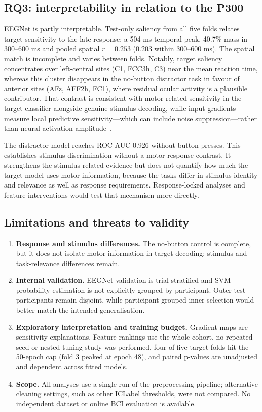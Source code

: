 \documentclass[11pt,a4paper]{article}
\begin{document}
\subsection{RQ3: interpretability in relation to the P300}
EEGNet is partly interpretable. Test-only saliency from all five folds relates target sensitivity to the late response: a 504 ms temporal peak, 40.7\% mass in 300--600 ms and pooled spatial $r=0.253$ ($0.203$ within 300--600 ms). The spatial match is incomplete and varies between folds. Notably, target saliency concentrates over left-central sites (C1, FCC3h, C3) near the mean reaction time, whereas this cluster disappears in the no-button distractor task in favour of anterior sites (AFz, AFF2h, FC1), where residual ocular activity is a plausible contributor. That contrast is consistent with motor-related sensitivity in the target classifier alongside genuine stimulus decoding, while input gradients measure local predictive sensitivity—which can include noise suppression—rather than neural activation amplitude~\cite{haufe}.

The distractor model reaches ROC-AUC 0.926 without button presses. This establishes stimulus discrimination without a motor-response contrast. It strengthens the stimulus-related evidence but does not quantify how much the target model uses motor information, because the tasks differ in stimulus identity and relevance as well as response requirements. Response-locked analyses and feature interventions would test that mechanism more directly.

\subsection{Limitations and threats to validity}
\begin{enumerate}
\item \textbf{Response and stimulus differences.} The no-button control is complete, but it does not isolate motor information in target decoding; stimulus and task-relevance differences remain.
\item \textbf{Internal validation.} EEGNet validation is trial-stratified and SVM probability estimation is not explicitly grouped by participant. Outer test participants remain disjoint, while participant-grouped inner selection would better match the intended generalisation.
\item \textbf{Exploratory interpretation and training budget.} Gradient maps are sensitivity explanations. Feature rankings use the whole cohort, no repeated-seed or nested tuning study was performed, four of five target folds hit the 50-epoch cap (fold 3 peaked at epoch 48), and paired p-values are unadjusted and dependent across fitted models.
\item \textbf{Scope.} All analyses use a single run of the preprocessing pipeline; alternative cleaning settings, such as other ICLabel thresholds, were not compared. No independent dataset or online BCI evaluation is available.
\end{enumerate}
\end{document}
